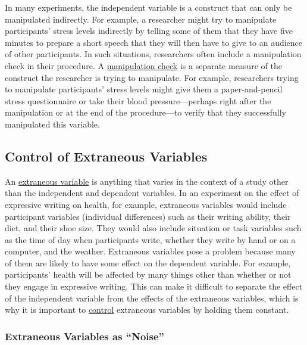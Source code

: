 \documentclass[
]{krantz}
\begin{document}
In many experiments, the independent variable is a construct that can only be manipulated indirectly. For example, a researcher might try to manipulate participants' stress levels indirectly by telling some of them that they have five minutes to prepare a short speech that they will then have to give to an audience of other participants. In such situations, researchers often include a manipulation check in their procedure. A \hyperref[manipulation-check]{manipulation check} is a separate measure of the construct the researcher is trying to manipulate. For example, researchers trying to manipulate participants' stress levels might give them a paper-and-pencil stress questionnaire or take their blood pressure---perhaps right after the manipulation or at the end of the procedure---to verify that they successfully manipulated this variable.

\subsection*{Control of Extraneous Variables}\label{control-of-extraneous-variables}


An \hyperref[extraneous-variable]{extraneous variable} is anything that varies in the context of a study other than the independent and dependent variables. In an experiment on the effect of expressive writing on health, for example, extraneous variables would include participant variables (individual differences) such as their writing ability, their diet, and their shoe size. They would also include situation or task variables such as the time of day when participants write, whether they write by hand or on a computer, and the weather. Extraneous variables pose a problem because many of them are likely to have some effect on the dependent variable. For example, participants' health will be affected by many things other than whether or not they engage in expressive writing. This can make it difficult to separate the effect of the independent variable from the effects of the extraneous variables, which is why it is important to \hyperref[control]{control} extraneous variables by holding them constant.

\subsubsection*{Extraneous Variables as ``Noise''}\label{extraneous-variables-as-noise}
\end{document}
